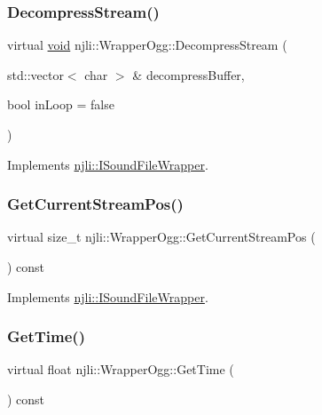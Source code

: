 \subsubsection{\texorpdfstring{Decompress\+Stream()}{DecompressStream()}}
{\footnotesize\ttfamily virtual \mbox{\hyperlink{_thread_8h_af1e856da2e658414cb2456cb6f7ebc66}{void}} njli\+::\+Wrapper\+Ogg\+::\+Decompress\+Stream (\begin{DoxyParamCaption}\item[{std\+::vector$<$ char $>$ \&}]{decompress\+Buffer,  }\item[{bool}]{in\+Loop = {\ttfamily false} }\end{DoxyParamCaption})\hspace{0.3cm}{\ttfamily [virtual]}}



Implements \mbox{\hyperlink{classnjli_1_1_i_sound_file_wrapper_a2e62b8b05da06eb1f9594ffdd5aa0cfd}{njli\+::\+I\+Sound\+File\+Wrapper}}.

\mbox{\label{classnjli_1_1_wrapper_ogg_a90e11afb177a4085c5925af77436cd91}} 
\subsubsection{\texorpdfstring{Get\+Current\+Stream\+Pos()}{GetCurrentStreamPos()}}
{\footnotesize\ttfamily virtual size\+\_\+t njli\+::\+Wrapper\+Ogg\+::\+Get\+Current\+Stream\+Pos (\begin{DoxyParamCaption}{ }\end{DoxyParamCaption}) const\hspace{0.3cm}{\ttfamily [virtual]}}



Implements \mbox{\hyperlink{classnjli_1_1_i_sound_file_wrapper_a7468aaf1e53cfd6feb38eae4ecf8ab99}{njli\+::\+I\+Sound\+File\+Wrapper}}.

\mbox{\label{classnjli_1_1_wrapper_ogg_a0fdf09ad6e5bde3de915140c39698a97}} 
\subsubsection{\texorpdfstring{Get\+Time()}{GetTime()}}
{\footnotesize\ttfamily virtual float njli\+::\+Wrapper\+Ogg\+::\+Get\+Time (\begin{DoxyParamCaption}{ }\end{DoxyParamCaption}) const\hspace{0.3cm}{\ttfamily [virtual]}}



